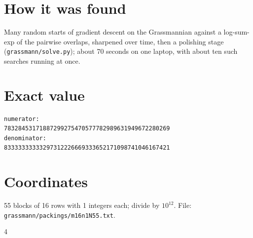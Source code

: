 \documentclass[11pt,a4paper]{article}
\begin{document}
\section{How it was found}
Many random starts of gradient descent on the Grassmannian against a log-sum-exp of the pairwise overlaps, sharpened over time, then a polishing stage (\texttt{grassmann/solve.py}); about 70 seconds on one laptop, with about ten such searches running at once.


\appendix
\section{Exact value}
{\small
\begin{verbatim}
numerator:
78328453171887299275470577782989631949672280269
denominator:
83333333333297312226669333652171098741046167421
\end{verbatim}}

\section{Coordinates}
55 blocks of 16 rows with 1 integers each; divide by $10^{12}$. File: \texttt{grassmann/packings/m16n1N55.txt}.
{\tiny
\begin{multicols}{4}
\end{multicols}}
\end{document}
